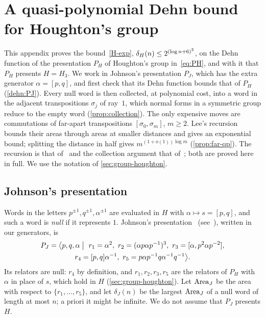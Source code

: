 \section{A quasi-polynomial Dehn bound for Houghton's group}\label{app:dehn}
\providecommand{\dehnA}{\mathsf A}
\providecommand{\dehnB}{\mathsf B}
\providecommand{\dehnE}{\mathsf E}
\providecommand{\dehnU}{\mathsf U}

This appendix proves the bound~\ref{H-exp}, $\delta_{H}(n)\le2^{(\log n+6)^2}$, on the Dehn function of the presentation $P_H$ of Houghton's
group in~\eqref{eq:PH}, and with it that $P_H$ presents $H=H_3$. We work in Johnson's presentation $P_J$, which has the extra generator
$\alpha=[p,q]$, and first check that its Dehn function bounds that of $P_H$ (\cref{dehn:PJ}). Every null word is then collected, at
polynomial cost, into a word in the adjacent transpositions $\sigma_j$ of ray~$1$, which normal forms in a symmetric group reduce to the
empty word (\cref{prop:collection}). The only expensive moves are commutations of far-apart transpositions $[\sigma_0,\sigma_m]$, $m\ge2$.
Lee's recursion~\cite[Section~4.2]{Lee12} bounds their areas through areas at smaller distances and gives an exponential bound; splitting
the distance in half gives $m^{(1+o(1))\log m}$ (\cref{prop:far-qp}). The recursion is that of~\cite[Section~3]{DM-H3} and the collection
argument that of~\cite[Theorem~3.3]{DM-H3}; both are proved here in full. We use the notation of \cref{sec:group-houghton}.

\subsection{Johnson's presentation}\label{dehn:sec-PJ}

Words in the letters $p^{\pm1},q^{\pm1},\alpha^{\pm1}$ are evaluated in $H$ with $\alpha\mapsto s=[p,q]$, and such a word is \emph{null} if
it represents $1$. Johnson's presentation~\cite{Joh99} (see~\cite[Theorem~2.8]{Lee12}), written in our generators, is
\begin{multline}\label{dehn:PJ-eq}
P_J=\bigl\langle p,q,\alpha\bigm|\ r_1=\alpha^2,\ r_2=(\alpha p\alpha p^{-1})^3,\ r_3=[\alpha,p^2\alpha p^{-2}],\\
r_4=[p,q]\alpha^{-1},\ r_5=p\alpha p^{-1}q\alpha^{-1}q^{-1}\bigr\rangle .
\end{multline}
Its relators are null: $r_4$ by definition, and $r_1,r_2,r_3,r_5$ are the relators of $P_H$ with $\alpha$ in place of $s$, which hold in $H$
(\cref{sec:group-houghton}). Let $\operatorname{Area}_J$ be the area with respect to $\{r_1,\dots,r_5\}$, and let $\delta_J(n)$ be the largest $\operatorname{Area}_J$ of a
null word of length at most $n$; a priori it might be infinite. We do not assume that $P_J$ presents $H$.

